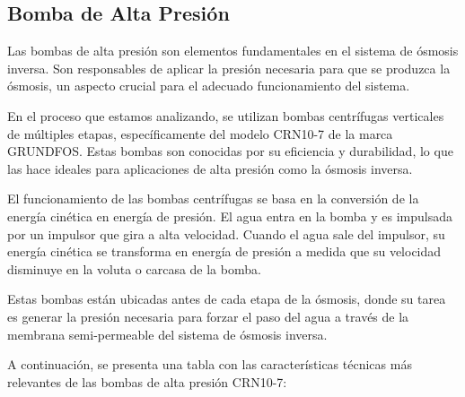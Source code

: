\subsection{Bomba de Alta Presión}

Las bombas de alta presión son elementos fundamentales en el sistema de ósmosis inversa. Son responsables de aplicar la presión necesaria para que se produzca la ósmosis, un aspecto crucial para el adecuado funcionamiento del sistema.

En el proceso que estamos analizando, se utilizan bombas centrífugas verticales de múltiples etapas, específicamente del modelo CRN10-7 de la marca GRUNDFOS. Estas bombas son conocidas por su eficiencia y durabilidad, lo que las hace ideales para aplicaciones de alta presión como la ósmosis inversa.

El funcionamiento de las bombas centrífugas se basa en la conversión de la energía cinética en energía de presión. El agua entra en la bomba y es impulsada por un impulsor que gira a alta velocidad. Cuando el agua sale del impulsor, su energía cinética se transforma en energía de presión a medida que su velocidad disminuye en la voluta o carcasa de la bomba.

Estas bombas están ubicadas antes de cada etapa de la ósmosis, donde su tarea es generar la presión necesaria para forzar el paso del agua a través de la membrana semi-permeable del sistema de ósmosis inversa.



A continuación, se presenta una tabla con las características técnicas más relevantes de las bombas de alta presión CRN10-7:

